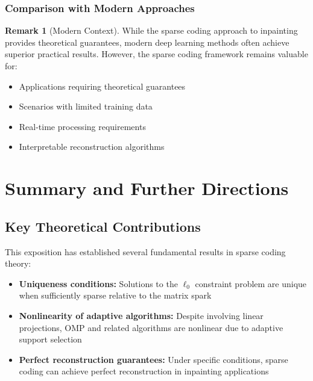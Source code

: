 \documentclass[12pt]{article}
\theoremstyle{definition}
\newtheorem{remark}[theorem]{Remark}
\begin{document}
\subsubsection{Comparison with Modern Approaches}

\begin{remark}[Modern Context]
    While the sparse coding approach to inpainting provides theoretical guarantees, modern deep learning methods often achieve superior practical results. However, the sparse coding framework remains valuable for:
    \begin{itemize}
        \item Applications requiring theoretical guarantees
        \item Scenarios with limited training data
        \item Real-time processing requirements
        \item Interpretable reconstruction algorithms
    \end{itemize}
\end{remark}

\newpage

\section{Summary and Further Directions}

\subsection{Key Theoretical Contributions}

This exposition has established several fundamental results in sparse coding theory:

\begin{itemize}
    \item \textbf{Uniqueness conditions:} Solutions to the $\ell_0$ constraint problem are unique when sufficiently sparse relative to the matrix spark
    \item \textbf{Nonlinearity of adaptive algorithms:} Despite involving linear projections, OMP and related algorithms are nonlinear due to adaptive support selection
    \item \textbf{Perfect reconstruction guarantees:} Under specific conditions, sparse coding can achieve perfect reconstruction in inpainting applications
\end{itemize}
\end{document}
